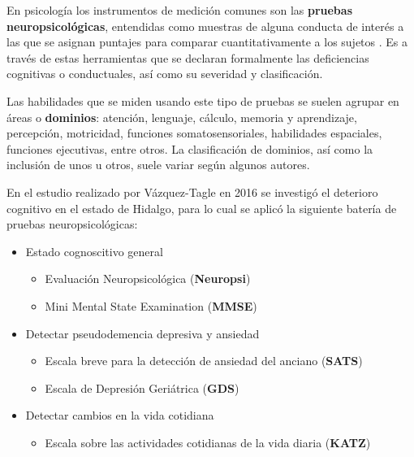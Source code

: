 En psicología los instrumentos de medición comunes son las \textbf{pruebas neuropsicológicas}, 
entendidas como muestras de alguna conducta de interés a las que se asignan puntajes para comparar 
cuantitativamente a los sujetos \cite{Ardila12}.
%
Es a través de estas herramientas que se declaran formalmente las deficiencias cognitivas o 
conductuales, así como su severidad y clasificación.

Las habilidades que se miden usando este tipo de pruebas se suelen agrupar en áreas o 
\textbf{dominios}: atención, lenguaje, cálculo, memoria y aprendizaje, percepción, motricidad, 
funciones somatosensoriales, habilidades espaciales, funciones ejecutivas, entre otros. 
La clasificación de dominios, así como la inclusión de unos u otros, suele
variar según algunos autores.
%
%

En el estudio realizado por Vázquez-Tagle en 2016 \cite{VazquezTagle16} se investigó el deterioro
cognitivo en el estado de Hidalgo, para lo cual se aplicó la siguiente batería de pruebas
neuropsicológicas:
\begin{itemize}
\item Estado cognoscitivo general
\begin{itemize}
\item {Evaluación Neuropsicológica (\textbf{Neuropsi})} \cite{Solis03}
\item {Mini Mental State Examination (\textbf{MMSE})} \cite{Velasco15}
\end{itemize}
\item Detectar pseudodemencia depresiva y ansiedad
\begin{itemize}
\item {Escala breve para la detección de ansiedad del anciano (\textbf{SATS})} \cite{Vargas11}
\item {Escala de Depresión Geriátrica (\textbf{GDS})} \cite{Yesavage82,Greenberg12}
\end{itemize}
\item Detectar cambios en la vida cotidiana
\begin{itemize}
\item {Escala sobre las actividades cotidianas de la vida diaria (\textbf{KATZ})} \cite{Roumec14}
\end{itemize}
\end{itemize}

